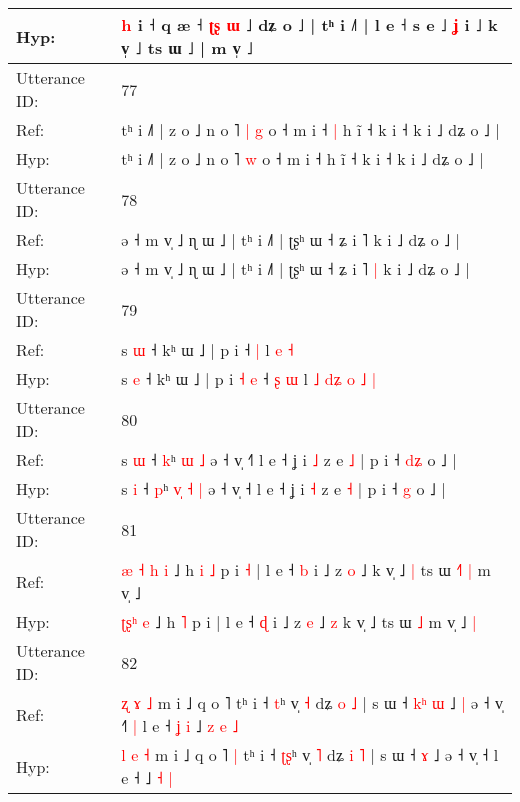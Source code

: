 \documentclass[10pt]{article}
\DeclareRobustCommand{\hl}[1]{{\textcolor{red}{#1}}}
\begin{document}
\begin{longtable}{ll}
 \\
Hyp: & \hl{}\hl{h} i ˧ q æ ˧\hl{}\hl{}\hl{} \hl{ʈ}\hl{ʂ} \hl{ɯ} ˩ dʑ o ˩ | tʰ i ˩˥ | l e ˧ s e ˩ \hl{ʝ} i ˩ k v̩ ˩ ts ɯ ˩ | m v̩ ˩\hl{}\hl{}
 \\
\midrule
Utterance ID: & 77 \\
Ref: & tʰ i ˩˥ | z o ˩ n o ˥\hl{ }\hl{|} \hl{g} o ˧ m i ˧\hl{ }\hl{|} h ĩ ˧ k i ˧ k i ˩ dʑ o ˩ |
 \\
Hyp: & tʰ i ˩˥ | z o ˩ n o ˥\hl{}\hl{} \hl{w} o ˧ m i ˧\hl{}\hl{} h ĩ ˧ k i ˧ k i ˩ dʑ o ˩ |
 \\
\midrule
Utterance ID: & 78 \\
Ref: & ə ˧ m v̩ ˩ ɳ ɯ ˩ | tʰ i ˩˥ | ʈʂʰ ɯ ˧ ʑ i ˥\hl{}\hl{} k i ˩ dʑ o ˩ |
 \\
Hyp: & ə ˧ m v̩ ˩ ɳ ɯ ˩ | tʰ i ˩˥ | ʈʂʰ ɯ ˧ ʑ i ˥\hl{ }\hl{|} k i ˩ dʑ o ˩ |
 \\
\midrule
Utterance ID: & 79 \\
Ref: & s \hl{ɯ} ˧ kʰ ɯ ˩ | p i\hl{}\hl{}\hl{}\hl{} ˧\hl{}\hl{} \hl{|} l\hl{}\hl{}\hl{}\hl{}\hl{}\hl{}\hl{} \hl{e} \hl{˧}
 \\
Hyp: & s \hl{e} ˧ kʰ ɯ ˩ | p i\hl{ }\hl{˧}\hl{ }\hl{e} ˧\hl{ }\hl{ʂ} \hl{ɯ} l\hl{ }\hl{˩}\hl{ }\hl{d}\hl{ʑ}\hl{ }\hl{o} \hl{˩} \hl{|}
 \\
\midrule
Utterance ID: & 80 \\
Ref: & s \hl{ɯ} ˧ \hl{k}ʰ\hl{}\hl{}\hl{} \hl{ɯ} \hl{˩} ə ˧ v̩ ˧\hl{˥} l e ˧ ʝ i \hl{˩} z e \hl{˩} | p i ˧ \hl{d}\hl{ʑ} o ˩ |
 \\
Hyp: & s \hl{i} ˧ \hl{p}ʰ\hl{ }\hl{v}\hl{̩} \hl{˧} \hl{|} ə ˧ v̩ ˧\hl{} l e ˧ ʝ i \hl{˧} z e \hl{˧} | p i ˧ \hl{}\hl{g} o ˩ |
 \\
\midrule
Utterance ID: & 81 \\
Ref: & \hl{æ}\hl{ }\hl{˧}\hl{ }\hl{h} \hl{i} ˩ h\hl{ }\hl{i} \hl{˩} p i\hl{ }\hl{˧} | l e ˧ \hl{b} i ˩ z \hl{o} ˩\hl{}\hl{} k v̩ ˩\hl{ }\hl{|} ts ɯ\hl{ }\hl{˧}\hl{˥} \hl{|} m v̩ ˩\hl{}\hl{}
 \\
Hyp: & \hl{}\hl{}\hl{ʈ}\hl{ʂ}\hl{ʰ} \hl{e} ˩ h\hl{}\hl{} \hl{˥} p i\hl{}\hl{} | l e ˧ \hl{ɖ} i ˩ z \hl{e} ˩\hl{ }\hl{z} k v̩ ˩\hl{}\hl{} ts ɯ\hl{}\hl{}\hl{} \hl{˩} m v̩ ˩\hl{ }\hl{|}
 \\
\midrule
Utterance ID: & 82 \\
Ref: & \hl{ʐ} \hl{ɤ} \hl{˩} m i ˩ q o ˥\hl{}\hl{} tʰ i ˧ \hl{}\hl{t}ʰ v̩ \hl{˧} dʑ \hl{o} \hl{˩} | s ɯ ˧\hl{ }\hl{k}\hl{ʰ} \hl{ɯ} ˩\hl{ }\hl{|} ə ˧ v̩ ˧\hl{˥}\hl{ }\hl{|} l e ˧\hl{ }\hl{ʝ}\hl{ }\hl{i} ˩\hl{ }\hl{z} \hl{e} \hl{˩}
 \\
Hyp: & \hl{l} \hl{e} \hl{˧} m i ˩ q o ˥\hl{ }\hl{|} tʰ i ˧ \hl{ʈ}\hl{ʂ}ʰ v̩ \hl{˥} dʑ \hl{i} \hl{˥} | s ɯ ˧\hl{}\hl{}\hl{} \hl{ɤ} ˩\hl{}\hl{} ə ˧ v̩ ˧\hl{}\hl{}\hl{} l e ˧\hl{}\hl{}\hl{}\hl{} ˩\hl{}\hl{} \hl{˧} \hl{|}

\end{longtable}
\end{document}
